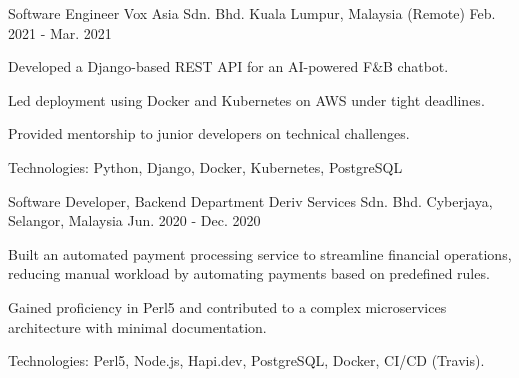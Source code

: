 \begin{cventries}
  \cventry
    {Software Engineer} %
    {Vox Asia Sdn. Bhd.} %
    {Kuala Lumpur, Malaysia (Remote)} %
    {Feb. 2021 - Mar. 2021} %
    {
      \begin{cvitems} %
        \item {Developed a Django-based REST API for an AI-powered F\&B chatbot.}
        \item {Led deployment using Docker and Kubernetes on AWS under tight deadlines.}
        \item {Provided mentorship to junior developers on technical challenges.}
        \item {Technologies: Python, Django, Docker, Kubernetes, PostgreSQL}
      \end{cvitems}
    }

  \cventry
    {Software Developer, Backend Department} %
    {Deriv Services Sdn. Bhd.} %
    {Cyberjaya, Selangor, Malaysia} %
    {Jun. 2020 - Dec. 2020} %
    {
      \begin{cvitems} %
        \item {Built an automated payment processing service to streamline financial operations, reducing manual workload by automating payments based on predefined rules.}
        \item {Gained proficiency in Perl5 and contributed to a complex microservices architecture with minimal documentation.}
        \item {Technologies: Perl5, Node.js, Hapi.dev, PostgreSQL, Docker, CI/CD (Travis).}
      \end{cvitems}
    }


\end{cventries}
